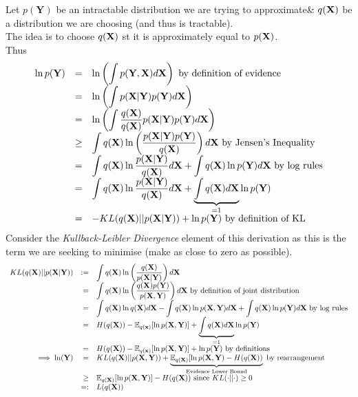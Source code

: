 \documentclass[11pt,a4paper]{article}
\begin{document}
Let $p(\textbf{Y})$ be an intractable distribution we are trying to approximate\& $q(\textbf{X})$ be a distribution we are choosing (and thus is tractable).\\
The idea is to choose $q(\textbf{X})$ st it is approximately equal to $p(\textbf{X})$.\\
Thus
\[\begin{array}{rcl}
\ln p(\textbf{Y})&=&\ln\left(\displaystyle\int p(\textbf{Y},\textbf{X})d\textbf{X}\right)\text{ by definition of evidence}\\
&=&\ln\left(\displaystyle\int p(\textbf{X}|\textbf{Y})p(\textbf{Y})d\textbf{X}\right)\\
&=&\ln\left(\displaystyle\int\dfrac{q(\textbf{X})}{q(\textbf{X})} p(\textbf{X}|\textbf{Y})p(\textbf{Y})d\textbf{X}\right)\\
&\geq&\displaystyle\int q(\textbf{X})\ln\left(\dfrac{p(\textbf{X}|\textbf{Y})p(\textbf{Y})}{q(\textbf{X})}\right)d\textbf{X}\text{ by Jensen's Inequality}\\
&=&\displaystyle\int q(\textbf{X})\ln\dfrac{p(\textbf{X}|\textbf{Y})}{q(\textbf{X})}d\textbf{X}+\displaystyle\int q(\textbf{X})\ln p(\textbf{Y})d\textbf{X}\text{ by log rules}\\
&=&\displaystyle\int q(\textbf{X})\ln\dfrac{p(\textbf{X}|\textbf{Y})}{q(\textbf{X})}d\textbf{X}+\displaystyle\underbrace{\int q(\textbf{X})d\textbf{X}}_{=1}\ln p(\textbf{Y})\\
&=&-KL(q(\textbf{X})||p(\textbf{X}|\textbf{Y}))+\ln p(\textbf{Y})\text{ by definition of KL}
\end{array}\]
Consider the \textit{Kullback-Leibler Divergence} element of this derivation as this is the term we are seeking to minimise (\ie make as close to zero as possible).
\[\begin{array}{rrl}
KL(q(\textbf{X})||p(\textbf{X}|\textbf{Y}))&:=&\displaystyle\int q(\textbf{X})\ln\left(\dfrac{q(\textbf{X})}{p(\textbf{X}|\textbf{Y})}\right)d\textbf{X}\\
&=&\displaystyle\int q(\textbf{X})\ln\left(\dfrac{q(\textbf{X})p(\textbf{Y})}{p(\textbf{X},\textbf{Y})}\right)d\textbf{X}\text{ by definition of joint distribution}\\
&=&\displaystyle\int q(\textbf{X})\ln q(\textbf{X})d\textbf{X}-\displaystyle\int q(\textbf{X})\ln p(\textbf{X},\textbf{Y})d\textbf{X}+\displaystyle\int q(\textbf{X})\ln p(\textbf{Y})d\textbf{X}\text{ by log rules}\\
&=&H(q(\textbf{X}))-\mathbb{E}_{q(\textbf{x})}[\ln p(\textbf{X},\textbf{Y})]+\underbrace{\displaystyle\int q(\textbf{X})d\textbf{X}}_{=1}\ln p(\textbf{Y})\\
&=&H(q(\textbf{X}))-\mathbb{E}_{q(\textbf{x})}[\ln p(\textbf{X},\textbf{Y})]+\ln p(\textbf{Y})\text{ by definitions}\\
\implies\ln(\textbf{Y})&=&KL(q(\textbf{X})||p(\textbf{X},\textbf{Y}))+\underbrace{\mathbb{E}_{q(\textbf{X})}[\ln p(\textbf{X},\textbf{Y})-H(q(\textbf{X}))}_\text{Evidence Lower Bound}\text{ by rearrangement}\\
&\geq&\mathbb{E}_{q(\textbf{X})}[\ln p(\textbf{X},\textbf{Y})]-H(q(\textbf{X}))\text{ since }KL(\cdot||\cdot)\geq0\\
&=:&L(q(\textbf{X}))
\end{array}\]
\end{document}
